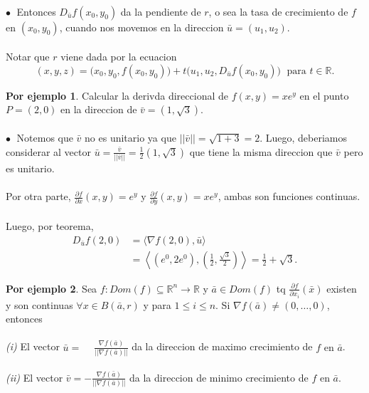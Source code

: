 \documentclass{article}
\theoremstyle{definition}
\theoremstyle{definition}
\newtheorem*{ej}{Por ejemplo}
\theoremstyle{remark}
\newcommand\bl{$\bullet\;$}
\begin{document}
\begin{figure}[h]
\centering
\def\svgwidth{1\textwidth}
\makebox[\textwidth]{
}
\end{figure} \\
\textcolor{verdep2}{\bl} Entonces $D_{\bar{u}}f(x_0,y_0)$ da la pendiente de $r$, o sea la tasa de crecimiento de $f$ en $(x_0,y_0)$, cuando nos movemos en la direccion $\bar{u}=(u_1,u_2).$ \\\\ Notar que $r$ viene dada por la ecuacion \[ 
(x,y,z)=\big(x_0,y_0,f(x_0,y_0)\big)+t\big(u_1,u_2,D_{\bar{u}}f(x_0,y_0)\big) \; \text{ para } t \in \mathbb{R}.
\] \pagebreak 
\begin{ej}
  Calcular la derivda direccional de $f(x,y)=xe^y$ en el punto $P=(2,0)$ en la direccion de $\bar{v}=(1,\sqrt{3})$.\\\\
  \textcolor{rojop2}{\bl} Notemos que $\bar{v}$ no es unitario ya que $||\bar{v}||=\sqrt{1+3}=2$. Luego, deberiamos considerar al vector $\bar{u}=\frac{\bar{v}}{||\bar{v}||}=\frac{1}{2}(1,\sqrt{3})$ que tiene la misma direccion que $\bar{v}$ pero es unitario. \\\\ Por otra parte, $\frac{\partial f}{\partial x}(x,y)=e^y$ y $\frac{\partial f}{\partial y}(x,y)=x e^y$, ambas son funciones continuas. \\\\ Luego, por teorema, $$\begin{aligned}
    D_{\bar{u}}f(2,0) & =\big\langle \nabla f(2,0),\bar{u} \big\rangle \\
                      & = \left\langle \left(e^0,2e^0\right),\left(\frac{1}{2},\frac{\sqrt{3}}{2}\right)\right\rangle = \frac{1}{2}+\sqrt{3}.
  \end{aligned}$$
\end{ej}
\begin{ej}
  Sea $f: Dom(f) \subseteq \mathbb{R}^n \to \mathbb{R}$ y $\bar{a} \in Dom(f)$ tq $\frac{\partial f}{\partial x_i}(\bar{x})$ existen y son continuas $\forall x \in B(\bar{a},r)$ y para $1 \leq i \leq n$. Si $\nabla f(\bar{a}) \neq (0,\dots,0)$, entonces \\\\
  \emph{(i)\phantom{i}} El vector $\bar{u}=\phantom{-}\frac{\nabla f(\bar{a})}{||\nabla f(\bar{a})||}$ da la direccion de maximo crecimiento de \mbox{$f \text{ en }\bar{a}$.} \\\\ 
  \emph{(ii)} El vector $\bar{v}=-\frac{\nabla f(\bar{a})}{||\nabla f(\bar{a})||}$ da la direccion de minimo crecimiento de $f$ en $\bar{a}$. \\\\
\end{ej}
\end{document}
